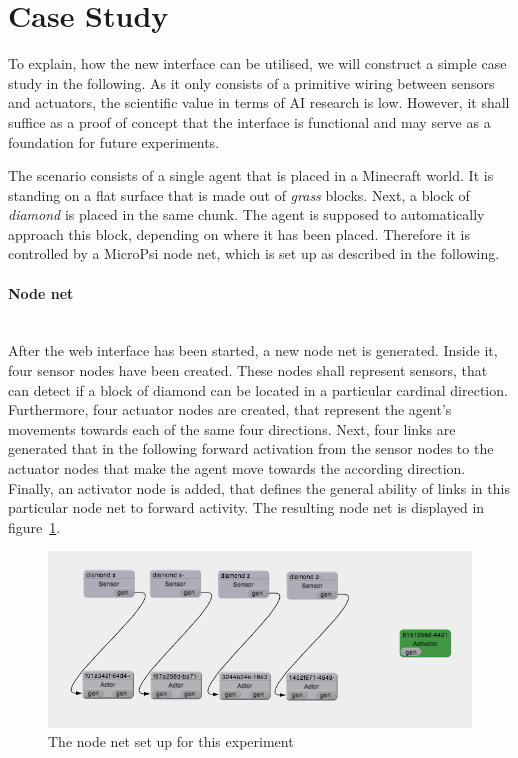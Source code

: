     \section{Case Study}
    \label{case_study}
    

To explain, how the new interface can be utilised, we will construct a simple case study in the following. As it only consists of a primitive wiring between sensors and actuators, the scientific value in terms of AI research is low. However, it shall suffice as a proof of concept that the interface is functional and may serve as a foundation for future experiments.

The scenario consists of a single agent that is placed in a Minecraft world. It is standing on a flat surface that is made out of \emph{grass} blocks. Next, a block of \emph{diamond} is placed in the same chunk. The agent is supposed to automatically approach this block, depending on where it has been placed. Therefore it is controlled by a MicroPsi node net, which is set up as described in the following.

\paragraph{Node net}$\;$ \\

After the web interface has been started, a new node net is generated. Inside it, four sensor nodes have been created. These nodes shall represent sensors, that can detect if a block of diamond can be located in a particular cardinal direction. Furthermore, four actuator nodes are created, that represent the agent's movements towards each of the same four directions. Next, four links are generated that in the following forward activation from the sensor nodes to the actuator nodes that make the agent move towards the according direction. Finally, an activator node is added, that defines the general ability of links in this particular node net to forward activity. The resulting node net is displayed in figure~\ref{nodenet_setup}.

\begin{figure}[h]
  \centering
    \includegraphics[width=14cm]{graphics/nodenet_setup}
  \caption{The node net set up for this experiment}
  \label{nodenet_setup}
\end{figure}

